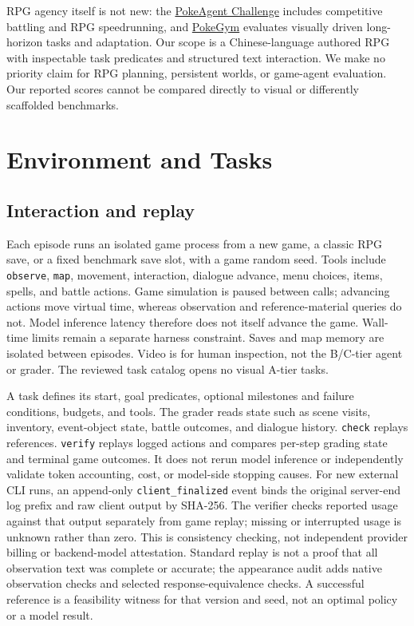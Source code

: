 \documentclass[11pt,a4paper]{article}
\begin{document}
RPG agency itself is not new: the \href{https://arxiv.org/abs/2603.15563}{PokeAgent Challenge} includes competitive battling and RPG speedrunning, and \href{https://arxiv.org/abs/2604.08340}{PokeGym} evaluates visually driven long-horizon tasks and adaptation. Our scope is a Chinese-language authored RPG with inspectable task predicates and structured text interaction. We make no priority claim for RPG planning, persistent worlds, or game-agent evaluation. Our reported scores cannot be compared directly to visual or differently scaffolded benchmarks.

\section{\texorpdfstring{Environment and Tasks}{Environment and Tasks}}

\subsection{\texorpdfstring{Interaction and replay}{Interaction and replay}}

Each episode runs an isolated game process from a new game, a classic RPG save, or a fixed benchmark save slot, with a game random seed. Tools include \texttt{observe}, \texttt{map}, movement, interaction, dialogue advance, menu choices, items, spells, and battle actions. Game simulation is paused between calls; advancing actions move virtual time, whereas observation and reference-material queries do not. Model inference latency therefore does not itself advance the game. Wall-time limits remain a separate harness constraint. Saves and map memory are isolated between episodes. Video is for human inspection, not the B/C-tier agent or grader. The reviewed task catalog opens no visual A-tier tasks.

A task defines its start, goal predicates, optional milestones and failure conditions, budgets, and tools. The grader reads state such as scene visits, inventory, event-object state, battle outcomes, and dialogue history. \texttt{check} replays references. \texttt{verify} replays logged actions and compares per-step grading state and terminal game outcomes. It does not rerun model inference or independently validate token accounting, cost, or model-side stopping causes. For new external CLI runs, an append-only \texttt{client\allowbreak{}\_\allowbreak{}finalized} event binds the original server-end log prefix and raw client output by SHA-256. The verifier checks reported usage against that output separately from game replay; missing or interrupted usage is unknown rather than zero. This is consistency checking, not independent provider billing or backend-model attestation. Standard replay is not a proof that all observation text was complete or accurate; the appearance audit adds native observation checks and selected response-equivalence checks. A successful reference is a feasibility witness for that version and seed, not an optimal policy or a model result.
\end{document}
